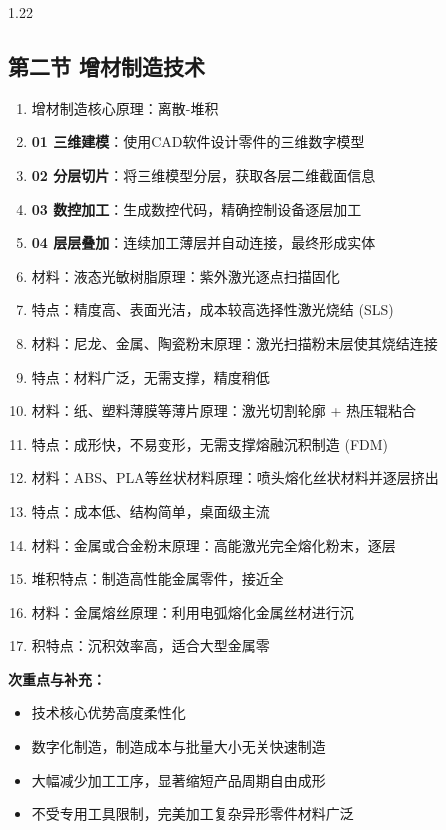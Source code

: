 \documentclass[12pt,a4paper]{article}
\begin{document}
\begin{spacing}{1.22}
\subsection{第二节 增材制造技术}
\begin{tcolorbox}[colback=yellow!6,colframe=red!55!black,title=重点,left=1mm,right=1mm]
\begin{enumerate}[leftmargin=2.2em,label=\arabic*.]
  \item 增材制造核心原理：离散-堆积
  \item \textbf{01 三维建模}：使用CAD软件设计零件的三维数字模型
  \item \textbf{02 分层切片}：将三维模型分层，获取各层二维截面信息
  \item \textbf{03 数控加工}：生成数控代码，精确控制设备逐层加工
  \item \textbf{04 层层叠加}：连续加工薄层并自动连接，最终形成实体
  \item 材料：液态光敏树脂原理：紫外激光逐点扫描固化
  \item 特点：精度高、表面光洁，成本较高选择性激光烧结 (SLS)
  \item 材料：尼龙、金属、陶瓷粉末原理：激光扫描粉末层使其烧结连接
  \item 特点：材料广泛，无需支撑，精度稍低
  \item 材料：纸、塑料薄膜等薄片原理：激光切割轮廓 + 热压辊粘合
  \item 特点：成形快，不易变形，无需支撑熔融沉积制造 (FDM)
  \item 材料：ABS、PLA等丝状材料原理：喷头熔化丝状材料并逐层挤出
  \item 特点：成本低、结构简单，桌面级主流
  \item 材料：金属或合金粉末原理：高能激光完全熔化粉末，逐层
  \item 堆积特点：制造高性能金属零件，接近全
  \item 材料：金属熔丝原理：利用电弧熔化金属丝材进行沉
  \item 积特点：沉积效率高，适合大型金属零
\end{enumerate}
\end{tcolorbox}
\noindent\textbf{次重点与补充：}
\begin{itemize}[leftmargin=2.2em,label=--]
  \item 技术核心优势高度柔性化
  \item 数字化制造，制造成本与批量大小无关快速制造
  \item 大幅减少加工工序，显著缩短产品周期自由成形
  \item 不受专用工具限制，完美加工复杂异形零件材料广泛

\end{itemize}
\end{spacing}
\end{document}
